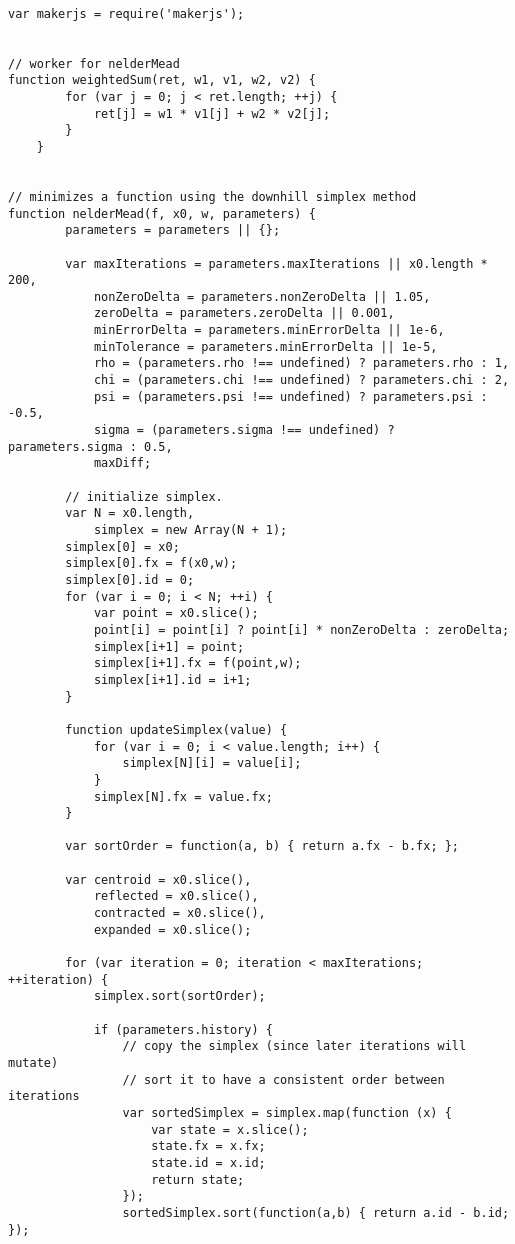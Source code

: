 \documentclass[11pt]{article}
\begin{document}
\tiny
\begin{lstlisting}

var makerjs = require('makerjs');


// worker for nelderMead
function weightedSum(ret, w1, v1, w2, v2) {
        for (var j = 0; j < ret.length; ++j) {
            ret[j] = w1 * v1[j] + w2 * v2[j];
        }
    }


// minimizes a function using the downhill simplex method
function nelderMead(f, x0, w, parameters) {
        parameters = parameters || {};

        var maxIterations = parameters.maxIterations || x0.length * 200,
            nonZeroDelta = parameters.nonZeroDelta || 1.05,
            zeroDelta = parameters.zeroDelta || 0.001,
            minErrorDelta = parameters.minErrorDelta || 1e-6,
            minTolerance = parameters.minErrorDelta || 1e-5,
            rho = (parameters.rho !== undefined) ? parameters.rho : 1,
            chi = (parameters.chi !== undefined) ? parameters.chi : 2,
            psi = (parameters.psi !== undefined) ? parameters.psi : -0.5,
            sigma = (parameters.sigma !== undefined) ? parameters.sigma : 0.5,
            maxDiff;

        // initialize simplex.
        var N = x0.length,
            simplex = new Array(N + 1);
        simplex[0] = x0;
        simplex[0].fx = f(x0,w);
        simplex[0].id = 0;
        for (var i = 0; i < N; ++i) {
            var point = x0.slice();
            point[i] = point[i] ? point[i] * nonZeroDelta : zeroDelta;
            simplex[i+1] = point;
            simplex[i+1].fx = f(point,w);
            simplex[i+1].id = i+1;
        }

        function updateSimplex(value) {
            for (var i = 0; i < value.length; i++) {
                simplex[N][i] = value[i];
            }
            simplex[N].fx = value.fx;
        }

        var sortOrder = function(a, b) { return a.fx - b.fx; };

        var centroid = x0.slice(),
            reflected = x0.slice(),
            contracted = x0.slice(),
            expanded = x0.slice();

        for (var iteration = 0; iteration < maxIterations; ++iteration) {
            simplex.sort(sortOrder);

            if (parameters.history) {
                // copy the simplex (since later iterations will mutate)
                // sort it to have a consistent order between iterations
                var sortedSimplex = simplex.map(function (x) {
                    var state = x.slice();
                    state.fx = x.fx;
                    state.id = x.id;
                    return state;
                });
                sortedSimplex.sort(function(a,b) { return a.id - b.id; });


\end{lstlisting}
\end{document}
